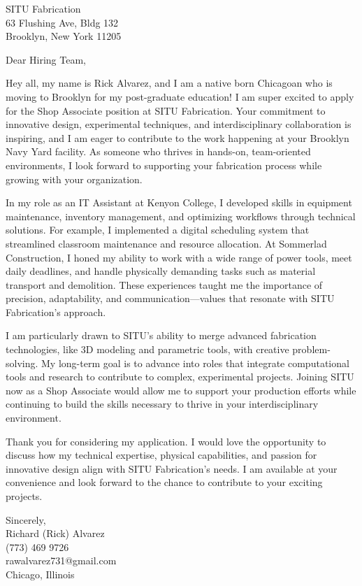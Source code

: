 \documentclass[a4paper,10pt]{letter}
\begin{document}
\begin{letter}{SITU Fabrication \\
63 Flushing Ave, Bldg 132 \\
Brooklyn, New York 11205}

\opening{Dear Hiring Team,}

Hey all, my name is Rick Alvarez, and I am a native born Chicagoan who is moving to Brooklyn for my post-graduate education! I am super excited to apply for the Shop Associate position at SITU Fabrication. Your commitment to innovative design, experimental techniques, and interdisciplinary collaboration is inspiring, and I am eager to contribute to the work happening at your Brooklyn Navy Yard facility. As someone who thrives in hands-on, team-oriented environments, I look forward to supporting your fabrication process while growing with your organization.

In my role as an IT Assistant at Kenyon College, I developed skills in equipment maintenance, inventory management, and optimizing workflows through technical solutions. For example, I implemented a digital scheduling system that streamlined classroom maintenance and resource allocation. At Sommerlad Construction, I honed my ability to work with a wide range of power tools, meet daily deadlines, and handle physically demanding tasks such as material transport and demolition. These experiences taught me the importance of precision, adaptability, and communication—values that resonate with SITU Fabrication’s approach.

I am particularly drawn to SITU’s ability to merge advanced fabrication technologies, like 3D modeling and parametric tools, with creative problem-solving. My long-term goal is to advance into roles that integrate computational tools and research to contribute to complex, experimental projects. Joining SITU now as a Shop Associate would allow me to support your production efforts while continuing to build the skills necessary to thrive in your interdisciplinary environment.

Thank you for considering my application. I would love the opportunity to discuss how my technical expertise, physical capabilities, and passion for innovative design align with SITU Fabrication’s needs. I am available at your convenience and look forward to the chance to contribute to your exciting projects.

\vspace{1em}

Sincerely, \\
Richard (Rick) Alvarez \\
(773) 469 9726 \\
rawalvarez731@gmail.com \\
Chicago, Illinois

\end{letter}
\end{document}
